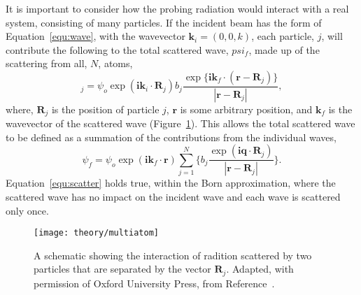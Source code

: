 It is important to consider how the probing radiation would interact with a real system, consisting of many particles.
If the incident beam has the form of Equation~\ref{equ:wave}, with the wavevector $\mathbf{k}_i = (0, 0, k)$, each particle, $j$, will contribute the following to the total scattered wave, $psi_f$, made up of the scattering from all, $N$, atoms,
%
\begin{equation}
    [\delta\psi_f]_j = \psi_o\exp{(\mathbf{ik}_i\cdot \mathbf{R}_j)}b_j\frac{\exp{\big\{\mathbf{ik}_f\cdot (\mathbf{r}-\mathbf{R}_j)\big\}}}{|\mathbf{r}-\mathbf{R}_j|},
\end{equation}
%
where, $\mathbf{R}_j$ is the position of particle $j$, $\mathbf{r}$ is some arbitrary position, and $\mathbf{k}_f$ is the wavevector of the scattered wave (Figure~\ref{fig:multiatom}).
This allows the total scattered wave to be defined as a summation of the contributions from the individual waves,
%
\begin{equation}
    \psi_f = \psi_o \exp{(\mathbf{ik}_f\cdot\mathbf{r})}\sum_{j=1}^{N}\bigg\{b_j \frac{\exp{(\mathbf{iq}\cdot \mathbf{R}_j)}}{|\mathbf{r}-\mathbf{R}_j|}\bigg\}.
    \label{equ:scatter}
\end{equation}
%
Equation~\ref{equ:scatter} holds true, within the Born approximation, where the scattered wave has no impact on the incident wave and each wave is scattered only once.
%
\begin{figure}
    \centering
    \texttt{[image: theory/multiatom]}
    \caption{A schematic showing the interaction of radition scattered by two particles that are separated by the vector $\mathbf{R}_j$. Adapted, with permission of Oxford University Press\textsuperscript{\textcopyright}, from Reference~\cite{sivia_elementary_2011}.}
    \label{fig:multiatom}
\end{figure}
%

